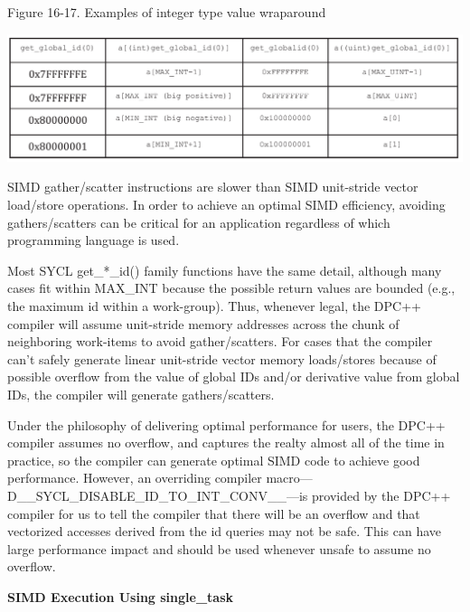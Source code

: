 \hspace*{\fill} \par %
Figure 16-17. Examples of integer type value wraparound
\begin{center}
	\includegraphics[width=1.0\textwidth]{content/chapter-16/images/12}
\end{center}

SIMD gather/scatter instructions are slower than SIMD unit-stride vector load/store operations. In order to achieve an optimal SIMD efficiency, avoiding gathers/scatters can be critical for an application regardless of which programming language is used.\par

Most SYCL get\_*\_id() family functions have the same detail, although many cases fit within MAX\_INT because the possible return values are bounded (e.g., the maximum id within a work-group). Thus, whenever legal, the DPC++ compiler will assume unit-stride memory addresses across the chunk of neighboring work-items to avoid gather/scatters. For cases that the compiler can’t safely generate linear unit-stride vector memory loads/stores because of possible overflow from the value of global IDs and/or derivative value from global IDs, the compiler will generate gathers/scatters.\par

Under the philosophy of delivering optimal performance for users, the DPC++ compiler assumes no overflow, and captures the realty almost all of the time in practice, so the compiler can generate optimal SIMD code to achieve good performance. However, an overriding compiler macro—D\_\_SYCL\_DISABLE\_ID\_TO\_INT\_CONV\_\_—is provided by the DPC++ compiler for us to tell the compiler that there will be an overflow and that vectorized accesses derived from the id queries may not be safe. This can have large performance impact and should be used whenever unsafe to assume no overflow.\par

\hspace*{\fill} \par %
\textbf{SIMD Execution Using single\_task}

